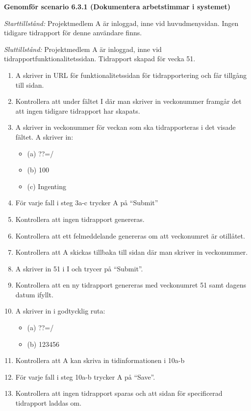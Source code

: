 \documentclass[a4paper]{article}
\begin{document}
\begin{ST}




\item
\textbf{Genomför scenario 6.3.1 (Dokumentera arbetstimmar i systemet)}

\emph{Starttillstånd:} Projektmedlem A är inloggad, inne vid huvudmenysidan. Ingen tidigare tidrapport för denne användare finns.

\emph{Sluttillstånd:} Projektmedlem A är inloggad, inne vid tidrapportfunktionalitetssidan. Tidrapport skapad för vecka 51.

\begin{enumerate}
\item A skriver in URL för funktionalitetssidan för tidrapportering och får tillgång till sidan.
\item Kontrollera att under fältet I där man skriver in veckonummer framgår det att ingen tidigare tidrapport har skapats.
\item A skriver in veckonummer för veckan som ska tidrapporteras i det visade fältet. A skriver in:
\begin{itemize}
\item[] (a) ??=/
\item[] (b) 100
\item[] (c) Ingenting
\end{itemize}
\item För varje fall i steg 3a-c trycker A på ``Submit''
\item Kontrollera att ingen tidrapport genereras.
\item Kontrollera att ett felmeddelande genereras om att veckonumret är otillåtet.
\item Kontrollera att A skickas tillbaka till sidan där man skriver in veckonummer.
\item A skriver in 51 i I och trycer på ``Submit''.
\item Kontrollera att en ny tidrapport genereras med veckonumret 51 samt dagens datum ifyllt.
\item A skriver in i godtycklig ruta:
\begin{itemize}
\item[] (a) ??=/
\item[] (b) 123456
\end{itemize}
\item Kontrollera att A kan skriva in tidinformationen i 10a-b
\item För varje fall i steg 10a-b trycker A på ``Save''. 
\item Kontrollera att ingen tidrapport sparas och att sidan för specificerad tidrapport laddas om.

\end{enumerate}
\end{ST}
\end{document}
